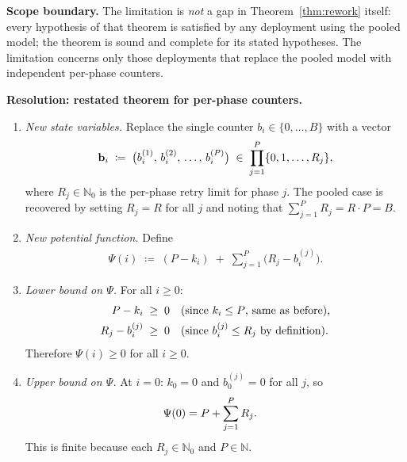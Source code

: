 \documentclass[12pt]{article}
\theoremstyle{definition}
\begin{document}
\medskip
\noindent\textbf{Scope boundary.}
The limitation is \emph{not} a gap in Theorem~\ref{thm:rework}
itself: every hypothesis of that theorem is satisfied by any
deployment using the pooled model; the theorem is sound and
complete for its stated hypotheses.  The limitation concerns only
those deployments that replace the pooled model with independent
per-phase counters.

\medskip
\noindent\textbf{Resolution: restated theorem for per-phase
counters.}

\begin{enumerate}
    \item \emph{New state variables.}
          Replace the single counter $b_i \in \{0,\ldots,B\}$ with a
          vector
          \begin{align}
              \mathbf{b}_i
              \;\coloneqq\;
              \bigl(b^{(1)}_i,\, b^{(2)}_i,\, \ldots,\, b^{(P)}_i\bigr)
              \;\in\;
              \prod_{j=1}^{P} \{0, 1, \ldots, R_j\},
              \notag
          \end{align}
          where $R_j \in \mathbb{N}_0$ is the per-phase retry limit
          for phase $j$.  The pooled case is recovered by setting
          $R_j = R$ for all $j$ and noting that
          $\sum_{j=1}^{P} R_j = R \cdot P = B$.

    \item \emph{New potential function.}
          Define
          \begin{align}
              \label{eq:lim-phi-perphase}
              \Psi(i)
              \;\coloneqq\;
              (P - k_i)
              \;+\;
              \sum_{j=1}^{P} \bigl(R_j - b^{(j)}_i\bigr).
          \end{align}

    \item \emph{Lower bound on $\Psi$.}
          For all $i \geq 0$:
          \begin{align}
              P - k_i \;\geq\; 0
              &\quad\text{(since $k_i \leq P$, same as before),}
              \notag\\
              R_j - b^{(j)}_i \;\geq\; 0
              &\quad\text{(since $b^{(j)}_i \leq R_j$ by definition).}
              \notag
          \end{align}
          Therefore $\Psi(i) \geq 0$ for all $i \geq 0$.

    \item \emph{Upper bound on $\Psi$.}
          At $i = 0$: $k_0 = 0$ and $b^{(j)}_0 = 0$ for all $j$, so
          \begin{align}
              \Psi(0)
              &= P + \sum_{j=1}^{P} R_j.
              \notag
          \end{align}
          This is finite because each $R_j \in \mathbb{N}_0$ and $P
          \in \mathbb{N}$.


\end{enumerate}
\end{document}
